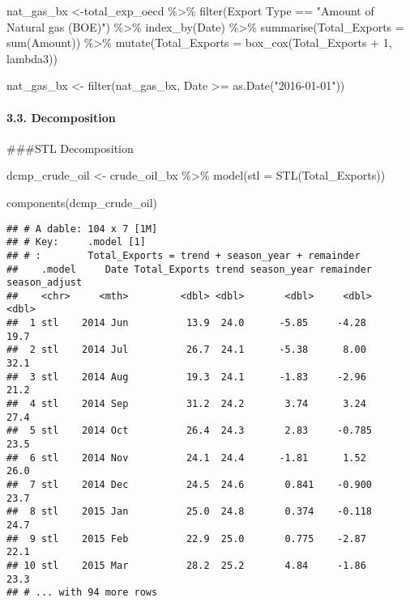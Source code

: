 \documentclass[
]{article}
\newenvironment{Shaded}{\begin{snugshade}}{\end{snugshade}}
\newcommand{\AttributeTok}[1]{\textcolor[rgb]{0.77,0.63,0.00}{#1}}
\newcommand{\DecValTok}[1]{\textcolor[rgb]{0.00,0.00,0.81}{#1}}
\newcommand{\FunctionTok}[1]{\textcolor[rgb]{0.00,0.00,0.00}{#1}}
\newcommand{\NormalTok}[1]{#1}
\newcommand{\OtherTok}[1]{\textcolor[rgb]{0.56,0.35,0.01}{#1}}
\newcommand{\SpecialCharTok}[1]{\textcolor[rgb]{0.00,0.00,0.00}{#1}}
\newcommand{\StringTok}[1]{\textcolor[rgb]{0.31,0.60,0.02}{#1}}
\begin{document}
\begin{Shaded}
\begin{Highlighting}[]
\NormalTok{nat\_gas\_bx }\OtherTok{\textless{}{-}}\NormalTok{total\_exp\_oecd }\SpecialCharTok{\%\textgreater{}\%} 
  \FunctionTok{filter}\NormalTok{(}\StringTok{\textasciigrave{}}\AttributeTok{Export Type}\StringTok{\textasciigrave{}} \SpecialCharTok{==} \StringTok{"Amount of Natural gas (BOE)"}\NormalTok{) }\SpecialCharTok{\%\textgreater{}\%} 
  \FunctionTok{index\_by}\NormalTok{(Date) }\SpecialCharTok{\%\textgreater{}\%} 
  \FunctionTok{summarise}\NormalTok{(}\AttributeTok{Total\_Exports =} \FunctionTok{sum}\NormalTok{(Amount)) }\SpecialCharTok{\%\textgreater{}\%} 
  \FunctionTok{mutate}\NormalTok{(}\AttributeTok{Total\_Exports =} \FunctionTok{box\_cox}\NormalTok{(Total\_Exports }\SpecialCharTok{+} \DecValTok{1}\NormalTok{, lambda3))}

\NormalTok{nat\_gas\_bx }\OtherTok{\textless{}{-}} \FunctionTok{filter}\NormalTok{(nat\_gas\_bx, Date }\SpecialCharTok{\textgreater{}=} \FunctionTok{as.Date}\NormalTok{(}\StringTok{"2016{-}01{-}01"}\NormalTok{))}
\end{Highlighting}
\end{Shaded}

\hypertarget{decomposition}{%
\paragraph{3.3. Decomposition}\label{decomposition}}

\#\#\#STL Decomposition

\begin{Shaded}
\begin{Highlighting}[]
\NormalTok{dcmp\_crude\_oil }\OtherTok{\textless{}{-}}\NormalTok{ crude\_oil\_bx }\SpecialCharTok{\%\textgreater{}\%}
  \FunctionTok{model}\NormalTok{(}\AttributeTok{stl =} \FunctionTok{STL}\NormalTok{(Total\_Exports))}

\FunctionTok{components}\NormalTok{(dcmp\_crude\_oil)}
\end{Highlighting}
\end{Shaded}

\begin{verbatim}
## # A dable: 104 x 7 [1M]
## # Key:     .model [1]
## # :        Total_Exports = trend + season_year + remainder
##    .model     Date Total_Exports trend season_year remainder season_adjust
##    <chr>     <mth>         <dbl> <dbl>       <dbl>     <dbl>         <dbl>
##  1 stl    2014 Jun          13.9  24.0      -5.85     -4.28           19.7
##  2 stl    2014 Jul          26.7  24.1      -5.38      8.00           32.1
##  3 stl    2014 Aug          19.3  24.1      -1.83     -2.96           21.2
##  4 stl    2014 Sep          31.2  24.2       3.74      3.24           27.4
##  5 stl    2014 Oct          26.4  24.3       2.83     -0.785          23.5
##  6 stl    2014 Nov          24.1  24.4      -1.81      1.52           26.0
##  7 stl    2014 Dec          24.5  24.6       0.841    -0.900          23.7
##  8 stl    2015 Jan          25.0  24.8       0.374    -0.118          24.7
##  9 stl    2015 Feb          22.9  25.0       0.775    -2.87           22.1
## 10 stl    2015 Mar          28.2  25.2       4.84     -1.86           23.3
## # ... with 94 more rows
\end{verbatim}
\end{document}
